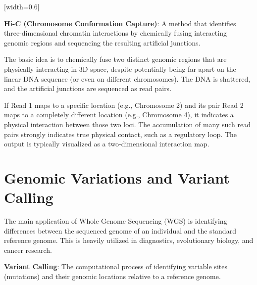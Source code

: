 [width=0.6\textwidth]

\begin{important}
  \textbf{Hi-C (Chromosome Conformation Capture)}: A method that identifies three-dimensional chromatin interactions by chemically fusing interacting genomic regions and sequencing the resulting artificial junctions.
\end{important}

The basic idea is to chemically fuse two distinct genomic regions that are physically interacting in 3D space, despite potentially being far apart on the linear DNA sequence (or even on different chromosomes). The DNA is shattered, and the artificial junctions are sequenced as read pairs. 

If Read 1 maps to a specific location (e.g., Chromosome 2) and its pair Read 2 maps to a completely different location (e.g., Chromosome 4), it indicates a physical interaction between those two loci. The accumulation of many such read pairs strongly indicates true physical contact, such as a regulatory loop. The output is typically visualized as a two-dimensional interaction map.

\section{Genomic Variations and Variant Calling}

The main application of Whole Genome Sequencing (WGS) is identifying differences between the sequenced genome of an individual and the standard reference genome. This is heavily utilized in diagnostics, evolutionary biology, and cancer research.

\begin{important}
  \textbf{Variant Calling}: The computational process of identifying variable sites (mutations) and their genomic locations relative to a reference genome.
\end{important}


